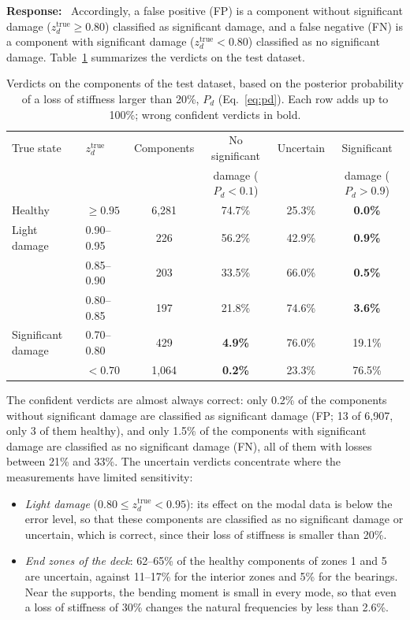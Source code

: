 \documentclass[11pt]{article}
\newenvironment{response}{\par\smallskip\noindent\color{resp}\textbf{Response:}\ }{\par}
\begin{document}
\begin{response}
Accordingly, a false positive (FP) is a component without significant damage ($z_d^{\text{true}}\ge0.80$) classified as significant damage, and a false negative (FN) is a component with significant damage ($z_d^{\text{true}}<0.80$) classified as no significant damage.
Table~\ref{tab:verdicts} summarizes the verdicts on the test dataset.
\begin{table}[H]
	\centering\small
	\caption{Verdicts on the components of the test dataset, based on the posterior probability of a loss of stiffness larger than 20\%, $P_d$ (Eq.~\eqref{eq:pd}). Each row adds up to 100\%; wrong confident verdicts in bold.}
	\label{tab:verdicts}
	\begin{tabular}{llcccc}
		\toprule
		True state & $z_d^{\text{true}}$ & Components & No significant & Uncertain & Significant \\
		& & & damage ($P_d<0.1$) & & damage ($P_d>0.9$) \\
		\midrule
		Healthy & $\ge0.95$ & 6,281 & 74.7\% & 25.3\% & \textbf{0.0\%} \\
		Light damage & 0.90--0.95 & 226 & 56.2\% & 42.9\% & \textbf{0.9\%} \\
		& 0.85--0.90 & 203 & 33.5\% & 66.0\% & \textbf{0.5\%} \\
		& 0.80--0.85 & 197 & 21.8\% & 74.6\% & \textbf{3.6\%} \\
		Significant damage & 0.70--0.80 & 429 & \textbf{4.9\%} & 76.0\% & 19.1\% \\
		& $<0.70$ & 1,064 & \textbf{0.2\%} & 23.3\% & 76.5\% \\
		\bottomrule
	\end{tabular}
\end{table}
The confident verdicts are almost always correct: only 0.2\% of the components without significant damage are classified as significant damage (FP; 13 of 6,907, only 3 of them healthy), and only 1.5\% of the components with significant damage are classified as no significant damage (FN), all of them with losses between 21\% and 33\%.
The uncertain verdicts concentrate where the measurements have limited sensitivity:
\begin{itemize}[leftmargin=*]
	\item \emph{Light damage} ($0.80\le z_d^{\text{true}}<0.95$): its effect on the modal data is below the error level, so that these components are classified as no significant damage or uncertain, which is correct, since their loss of stiffness is smaller than 20\%.
	\item \emph{End zones of the deck}: 62--65\% of the healthy components of zones 1 and 5 are uncertain, against 11--17\% for the interior zones and 5\% for the bearings. Near the supports, the bending moment is small in every mode, so that even a loss of stiffness of 30\% changes the natural frequencies by less than 2.6\%.

\end{itemize}
\end{response}
\end{document}

